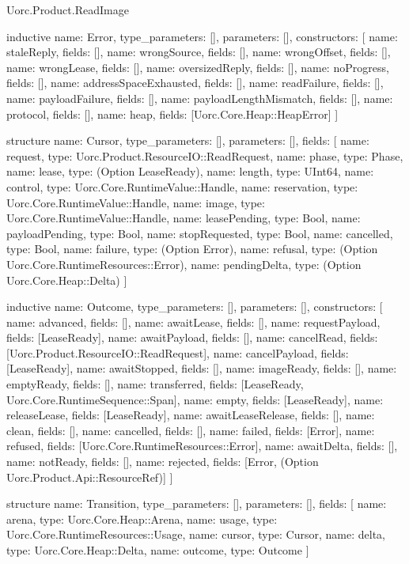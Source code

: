 \begin{lexlean}{Uorc.Product.ReadImage}
\begin{semanticmodule}
inductive{
  name: Error,
  type_parameters: [],
  parameters: [],
  constructors: [
    {name: staleReply, fields: []},
    {name: wrongSource, fields: []},
    {name: wrongOffset, fields: []},
    {name: wrongLease, fields: []},
    {name: oversizedReply, fields: []},
    {name: noProgress, fields: []},
    {name: addressSpaceExhausted, fields: []},
    {name: readFailure, fields: []},
    {name: payloadFailure, fields: []},
    {name: payloadLengthMismatch, fields: []},
    {name: protocol, fields: []},
    {name: heap, fields: [Uorc.Core.Heap::HeapError]}
  ]
}

structure{
  name: Cursor,
  type_parameters: [],
  parameters: [],
  fields: [
    {name: request, type: Uorc.Product.ResourceIO::ReadRequest},
    {name: phase, type: Phase},
    {name: lease, type: (Option LeaseReady)},
    {name: length, type: UInt64},
    {name: control, type: Uorc.Core.RuntimeValue::Handle},
    {name: reservation, type: Uorc.Core.RuntimeValue::Handle},
    {name: image, type: Uorc.Core.RuntimeValue::Handle},
    {name: leasePending, type: Bool},
    {name: payloadPending, type: Bool},
    {name: stopRequested, type: Bool},
    {name: cancelled, type: Bool},
    {name: failure, type: (Option Error)},
    {name: refusal, type: (Option Uorc.Core.RuntimeResources::Error)},
    {name: pendingDelta, type: (Option Uorc.Core.Heap::Delta)}
  ]
}

inductive{
  name: Outcome,
  type_parameters: [],
  parameters: [],
  constructors: [
    {name: advanced, fields: []},
    {name: awaitLease, fields: []},
    {name: requestPayload, fields: [LeaseReady]},
    {name: awaitPayload, fields: []},
    {name: cancelRead, fields: [Uorc.Product.ResourceIO::ReadRequest]},
    {name: cancelPayload, fields: [LeaseReady]},
    {name: awaitStopped, fields: []},
    {name: imageReady, fields: []},
    {name: emptyReady, fields: []},
    {name: transferred, fields: [LeaseReady, Uorc.Core.RuntimeSequence::Span]},
    {name: empty, fields: [LeaseReady]},
    {name: releaseLease, fields: [LeaseReady]},
    {name: awaitLeaseRelease, fields: []},
    {name: clean, fields: []},
    {name: cancelled, fields: []},
    {name: failed, fields: [Error]},
    {name: refused, fields: [Uorc.Core.RuntimeResources::Error]},
    {name: awaitDelta, fields: []},
    {name: notReady, fields: []},
    {name: rejected, fields: [Error, (Option Uorc.Product.Api::ResourceRef)]}
  ]
}

structure{
  name: Transition,
  type_parameters: [],
  parameters: [],
  fields: [
    {name: arena, type: Uorc.Core.Heap::Arena},
    {name: usage, type: Uorc.Core.RuntimeResources::Usage},
    {name: cursor, type: Cursor},
    {name: delta, type: Uorc.Core.Heap::Delta},
    {name: outcome, type: Outcome}
  ]
}


\end{semanticmodule}
\end{lexlean}
